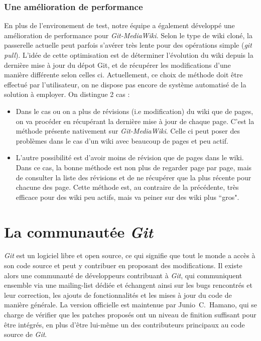 \documentclass[11pt]{article}
\begin{document}
\subsubsection{Une amélioration de performance}

En plus de l'environement de test, notre équipe a également développé 
une amélioration de performance pour \textit{Git-MediaWiki}. Selon le
type de wiki cloné, la passerelle actuelle peut parfois s'avérer très
lente pour des opérations simple (\textit{git pull}). L'idée de cette
optimisation est de déterminer l'évolution du wiki depuis la dernière
mise à jour du dépot Git, et de récupérer les modifications d'une 
manière différente selon celles ci. Actuellement, ce choix de méthode
doit être effectué par l'utilisateur, on ne dispose pas encore de
système automatisé de la solution à employer.  On distingue 2 cas :

\begin{itemize}
\item Dans le cas ou on a plus de révisions (i.e modification) du wiki 
  que de pages, on va procéder en récupérant la dernière mise à jour de chaque
  page. C'est la méthode présente nativement sur \textit{Git-MediaWiki}. Celle
  ci peut poser des problèmes dans le cas d'un wiki avec beaucoup de pages et
  peu actif.\\
\item L'autre possibilité est d'avoir moins de révision que de pages dans le
  wiki. Dans ce cas, la bonne méthode est non plus de regarder page par page,
  mais de consulter la liste des révisions et de ne récupérer que la plus récente
  pour chacune des page. Cette méthode est, au contraire de la précédente, très
  efficace pour des wiki peu actifs, mais va peiner sur des wiki plus ``gros". 
\end{itemize}

\section{La communautée \textit{Git}}

\textit{Git} est un logiciel libre et open source, ce qui signifie que
tout le monde a accès à son code source et peut y contribuer en
proposant des modifications. Il existe alors une communauté de
développeurs contribuant à \textit{Git}, qui communiquent ensemble via
une mailing-list dédiée et échangent ainsi sur les bugs rencontrés et
leur correction, les ajouts de fonctionnalités et les mises à jour du
code de manière générale. La version officielle est maintenue par
Junio~C.~Hamano, qui se charge de vérifier que les patches proposés
ont un niveau de finition suffisant pour être intégrés, en plus d'être
lui-même un des contributeurs principaux au code source de \textit{Git}.
\end{document}
